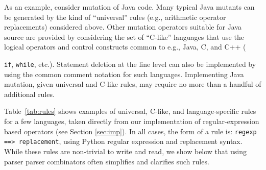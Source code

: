 \documentclass[sigconf,review, anonymous]{acmart}
\begin{document}
As an
example, consider mutation of Java code.  Many typical Java mutants can be
generated by the kind of ``universal'' rules (e.g., arithmetic
operator replacements) considered above.  Other mutation operators
suitable for Java source are provided by considering the set of
``C-like'' languages that use the logical operators and control
constructs common to e.g.,  Java, C, and C++ ({{\tt if}, {\tt while},
  etc.).  Statement deletion at the line level can also be implemented
  by using the common comment notation for such languages.
  Implementing Java mutation, given universal and C-like rules, may
  require no more than a handful of additional rules.

\begin{table}[hbtp]
\centering
\caption{Regular Expression Rule Examples}
\label{tab:rules}

\end{table}
  
Table~\ref{tab:rules} shows examples of universal, C-like, and
language-specific rules for a few languages, taken directly from our
implementation of regular-expression based operators (see Section \ref{sec:imp}).  In all cases, the form of a rule is: {\tt regexp
  ==> replacement}, using Python regular expression and replacement
syntax.  While these rules are non-trivial to write and read, we show
below that using parser parser combinators often simplifies and
clarifies such rules.

}
\end{document}
